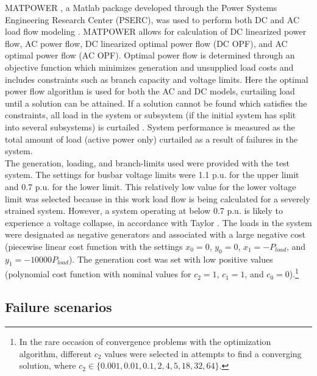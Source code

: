 MATPOWER \cite{Zimmerman2011}, a Matlab package developed through the Power Systems Engineering Research Center (PSERC), was used to perform both DC and AC load flow modeling \cite{Zimmerman2011}. MATPOWER allows for calculation of DC linearized power flow, AC power flow, DC linearized optimal power flow (DC OPF), and AC optimal power flow (AC OPF). Optimal power flow is determined through an objective function which minimizes generation and unsupplied load costs and includes constraints such as branch capacity and voltage limits. Here the optimal power flow algorithm is used for both the AC and DC models, curtailing load until a solution can be attained. If a solution cannot be found which satisfies the constraints, all load in the system or subsystem (if the initial system has split into several subsystems) is curtailed \cite{IEEE1995, Billinton1996, Arnborg1997, Arini1999, Ladhani2004}. System performance is measured as the total amount of load (active power only) curtailed as a result of failures in the system.
\\
\indent
The generation, loading, and branch-limits used were provided with the test system. The settings for busbar voltage limits were 1.1 p.u. for the upper limit and 0.7 p.u. for the lower limit.  This relatively low value for the lower voltage limit was selected because in this work load flow is being calculated for a severely strained system. However, a system operating at below 0.7 p.u. is likely to experience a voltage collapse, in accordance with Taylor \cite{Taylor1994}. The loads in the system were designated as negative generators and associated with a large negative cost (piecewise linear cost function with the settings $x_0=0$, $y_0=0$, $x_1=-P_{load}$, and $y_1=-10000P_{load}$). The generation cost was set with low positive values (polynomial cost function with nominal values for $c_2=1$, $c_1=1$, and $c_0=0$).\footnote[6]{In the rare occasion of convergence problems with the optimization algorithm, different $c_2$ values were selected in attempts to find a converging solution, where $c_2 \in \{0.001, 0.01, 0.1, 2, 4, 5, 18, 32, 64\}$.}
 

\subsection{Failure scenarios}
\label{ssec:methods:failures}

